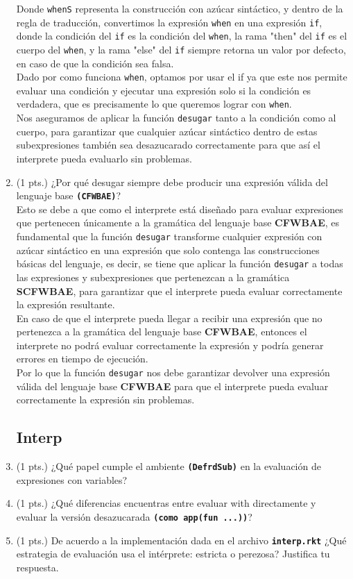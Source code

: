 \documentclass[11pt]{article}
\begin{document}
\begin{enumerate}
    Donde \texttt{whenS} representa la construcción con azúcar sintáctico, y dentro de la regla de traducción, convertimos la expresión \texttt{when} en una expresión \texttt{if}, donde la condición del \texttt{if} es la condición del \texttt{when}, la rama "then" del \texttt{if} es el cuerpo del \texttt{when}, y la rama "else" del \texttt{if} siempre retorna un valor por defecto, en caso de que la condición sea falsa.\\
    Dado por como funciona \texttt{when}, optamos por usar el if ya que este nos permite evaluar una condición y ejecutar una expresión solo si la condición es verdadera, que es precisamente lo que queremos lograr con \texttt{when}.\\
    Nos aseguramos de aplicar la función \texttt{desugar} tanto a la condición como al cuerpo, para garantizar que cualquier azúcar sintáctico dentro de estas subexpresiones también sea desazucarado correctamente para que así el interprete pueda evaluarlo sin problemas.

    \item (1 pts.) ¿Por qué desugar siempre debe producir una expresión válida del lenguaje base \texttt{\textbf{(CFWBAE)}}?\\
    Esto se debe a que como el interprete está diseñado para evaluar expresiones que pertenecen únicamente a la gramática del lenguaje base \textbf{CFWBAE}, es fundamental que la función \texttt{desugar} transforme cualquier expresión con azúcar sintáctico en una expresión que solo contenga las construcciones básicas del lenguaje, es decir, se tiene que aplicar la función \texttt{desugar} a todas las expresiones y subexpresiones que pertenezcan a la gramática \textbf{SCFWBAE}, para garantizar que el interprete pueda evaluar correctamente la expresión resultante.\\
    En caso de que el interprete pueda llegar a recibir una expresión que no pertenezca a la gramática del lenguaje base \textbf{CFWBAE}, entonces el interprete no podrá evaluar correctamente la expresión y podría generar errores en tiempo de ejecución.\\
    Por lo que la función \texttt{desugar} nos debe garantizar devolver una expresión válida del lenguaje base \textbf{CFWBAE} para que el interprete pueda evaluar correctamente la expresión sin problemas.

    \subsection{Interp}
    \item (1 pts.) ¿Qué papel cumple el ambiente \texttt{\textbf{(DefrdSub)}} en la evaluación de expresiones con variables?
    \item (1 pts.) ¿Qué diferencias encuentras entre evaluar with directamente y evaluar la versión desazucarada \texttt{\textbf{(como app(fun ...))}}?
    \item (1 pts.) De acuerdo a la implementación dada en el archivo \texttt{\textbf{interp.rkt}} ¿Qué estrategia de evaluación usa el intérprete: estricta o perezosa? Justifica tu respuesta.
\end{enumerate}
\end{document}

